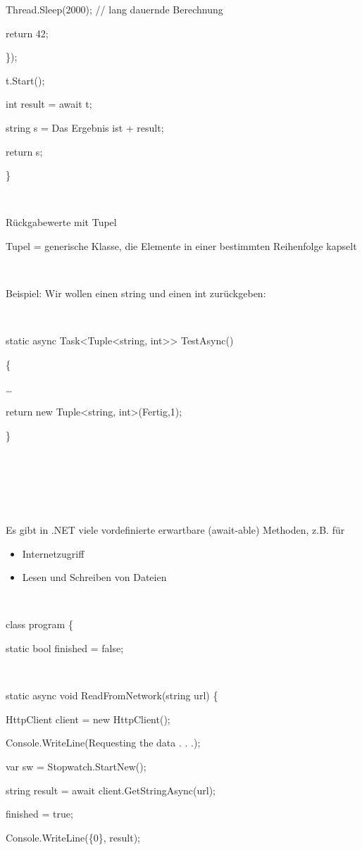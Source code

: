 Thread.Sleep(2000); // lang dauernde Berechnung 

return 42; 

\}); 

t.Start(); 

int result = await t; 

string s = {\textquotedbl}Das Ergebnis ist{\textquotedbl} + result; 

return s; 

\} 

~

Rückgabewerte mit Tupel

Tupel = generische Klasse, die Elemente in einer bestimmten Reihenfolge kapselt

~

Beispiel: Wir wollen einen string und einen int zurückgeben:

~

 static async Task{\textless}Tuple{\textless}string, int{\textgreater}{\textgreater} TestAsync()

 \{

 …

 return new Tuple{\textless}string, int{\textgreater}({\textquotedbl}Fertig{\textquotedbl},1);

 \}

~

~

~

Es gibt in .NET viele vordefinierte erwartbare (await-able) Methoden, z.B. für

\begin{itemize}
\item Internetzugriff
\item Lesen und Schreiben von Dateien
\end{itemize}
~

 class program \{

  static bool finished = false;

~

 static async void ReadFromNetwork(string url)  \{  

 HttpClient client = new HttpClient();

 Console.WriteLine({\textquotedbl}Requesting the data . . .{\textquotedbl});

 var sw = Stopwatch.StartNew();

 string result = await client.GetStringAsync(url);  

 finished = true;

 Console.WriteLine({\textquotedbl}\{0\}{\textquotedbl}, result);  

